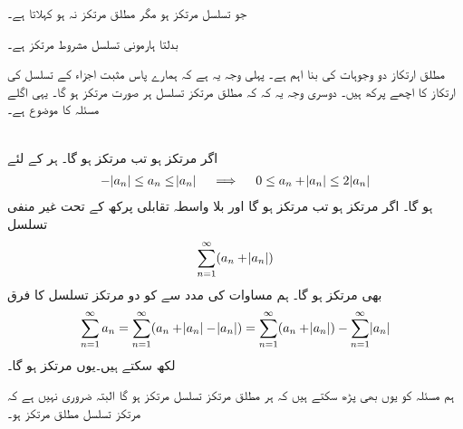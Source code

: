 جو تسلسل مرتکز ہو مگر مطلق مرتکز نہ ہو  کہلاتا ہے۔

بدلتا ہارمونی تسلسل مشروط مرتکز ہے۔

مطلق ارتکاز دو وجوہات کی بنا اہم ہے۔ پہلی وجہ یہ ہے کہ ہمارے پاس مثبت اجزاء کے تسلسل کی ارتکاز کا اچھے پرکھ ہیں۔ دوسری وجہ یہ کہ کہ مطلق مرتکز تسلسل ہر صورت مرتکز ہو گا۔ یہی اگلے مسئلہ کا موضوع ہے۔

\\
اگر  مرتکز ہو تب  مرتکز ہو گا۔
ہر  کے لئے
\begin{align*}
-\abs{a_n}\le a_n\le \abs{a_n}\quad \implies \quad 0\le a_n+\abs{a_n}\le 2\abs{a_n}
\end{align*}
ہو گا۔ اگر  مرتکز ہو تب  مرتکز ہو گا اور بلا واسطہ تقابلی پرکھ کے تحت  غیر منفی تسلسل 
\begin{align*}
\sum_{n=1}^{\infty}(a_n+\abs{a_n})
\end{align*}
بھی مرتکز ہو گا۔ ہم مساوات  کی مدد سے   کو دو مرتکز تسلسل کا فرق 
\begin{align*}
\sum_{n=1}^{\infty}a_n=\sum_{n=1}^{\infty}(a_n+\abs{a_n}-\abs{a_n})=\sum_{n=1}^{\infty}(a_n+\abs{a_n})-\sum_{n=1}^{\infty}\abs{a_n}
\end{align*}
لکھ سکتے ہیں۔یوں  مرتکز ہو گا۔

ہم مسئلہ  کو یوں بھی پڑھ سکتے ہیں کہ ہر مطلق مرتکز تسلسل مرتکز ہو گا البتہ ضروری نہیں ہے کہ مرتکز تسلسل مطلق مرتکز ہو۔

